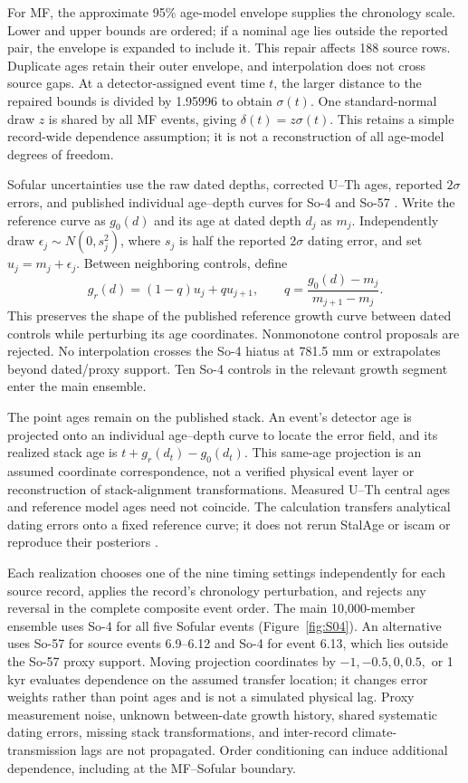 \documentclass[11pt]{article}
\begin{document}
For MF, the approximate 95\% age-model envelope supplies the chronology scale. Lower and upper bounds are ordered; if a nominal age lies outside the reported pair, the envelope is expanded to include it. This repair affects 188 source rows. Duplicate ages retain their outer envelope, and interpolation does not cross source gaps. At a detector-assigned event time $t$, the larger distance to the repaired bounds is divided by 1.95996 to obtain $\sigma(t)$. One standard-normal draw $z$ is shared by all MF events, giving $\delta(t)=z\sigma(t)$. This retains a simple record-wide dependence assumption; it is not a reconstruction of all age-model degrees of freedom.

Sofular uncertainties use the raw dated depths, corrected U--Th ages, reported $2\sigma$ errors, and published individual age--depth curves for So-4 and So-57 \citep{held2024dansgaard,held2024sofularData}. Write the reference curve as $g_0(d)$ and its age at dated depth $d_j$ as $m_j$. Independently draw $\epsilon_j\sim N(0,s_j^2)$, where $s_j$ is half the reported $2\sigma$ dating error, and set $u_j=m_j+\epsilon_j$. Between neighboring controls, define
\begin{equation}
 g_r(d)=(1-q)u_j+q u_{j+1},\qquad
 q=\frac{g_0(d)-m_j}{m_{j+1}-m_j}.
\end{equation}
This preserves the shape of the published reference growth curve between dated controls while perturbing its age coordinates. Nonmonotone control proposals are rejected. No interpolation crosses the So-4 hiatus at 781.5 mm or extrapolates beyond dated/proxy support. Ten So-4 controls in the relevant growth segment enter the main ensemble.

The point ages remain on the published stack. An event's detector age is projected onto an individual age--depth curve to locate the error field, and its realized stack age is $t+g_r(d_t)-g_0(d_t)$. This same-age projection is an assumed coordinate correspondence, not a verified physical event layer or reconstruction of stack-alignment transformations. Measured U--Th central ages and reference model ages need not coincide. The calculation transfers analytical dating errors onto a fixed reference curve; it does not rerun StalAge or iscam or reproduce their posteriors \citep{scholz2011stalage,fohlmeister2012statistical}.

Each realization chooses one of the nine timing settings independently for each source record, applies the record's chronology perturbation, and rejects any reversal in the complete composite event order. The main 10,000-member ensemble uses So-4 for all five Sofular events (Figure~\ref{fig:S04}). An alternative uses So-57 for source events 6.9--6.12 and So-4 for event 6.13, which lies outside the So-57 proxy support. Moving projection coordinates by $-1,-0.5,0,0.5,$ or 1 kyr evaluates dependence on the assumed transfer location; it changes error weights rather than point ages and is not a simulated physical lag. Proxy measurement noise, unknown between-date growth history, shared systematic dating errors, missing stack transformations, and inter-record climate-transmission lags are not propagated. Order conditioning can induce additional dependence, including at the MF--Sofular boundary.
\end{document}
